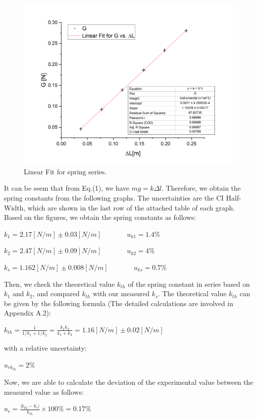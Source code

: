 \documentclass[a4paper,12pt]{article}
\begin{document}
\begin{figure}[p] 
    \centering
    \includegraphics[width=1\textwidth]{pic3} 
    \caption{Linear Fit for spring series.} 
\end{figure}

It can be seem that from Eq.(1), we have $mg = k\Delta l$. Therefore, we obtain the spring constants from the following graphs. The uncertainties are the CI Half-Width, which are shown in the last row of the attached table of each graph. Based on the figures, we obtain the spring constants as follows:
\begin{center}
$ k_1 = 2.17 [N/m] \pm 0.03 [N/m] $ ~~~~~~ $ u_{k1} = 1.4\% $
\end{center}
\begin{center}
$ k_2 = 2.47 [N/m] \pm 0.09 [N/m] $ ~~~~~~ $ u_{k2} = 4\% $
\end{center}
\begin{center}
$ k_s = 1.162[N/m] \pm 0.008[N/m] $ ~~~~~~ $ u_{ks} = 0.7\% $
\end{center}

\par Then, we check the theoretical value $ k_{th} $ of the spring constant in series based on $k_1$ and $k_2$, and compared $k_{th}$ with our measured $k_s$. The theoretical value $k_{th}$ can be given by the following formula (The detailed calculations are involved in Appendix A.2):
\begin{center}
$\displaystyle  k_{th} = \frac{1}{1/k_1 + 1/k_2} = \frac{k_1k_2}{k_1+k_2} = 1.16 [N/m] \pm 0.02 [N/m]$
\end{center}
with a relative uncertainty:
\begin{center}
$ u_{rk_{th}} = 2\% $
\end{center}
\par Now, we are able to calculate the deviation of the experimental value between the measured value as follows:
\begin{center}
$ \displaystyle u_{r} = \frac{|k_{th} - k_s|}{k_{th}}\times 100\% = 0.17 \% $
\end{center}
\end{document}
